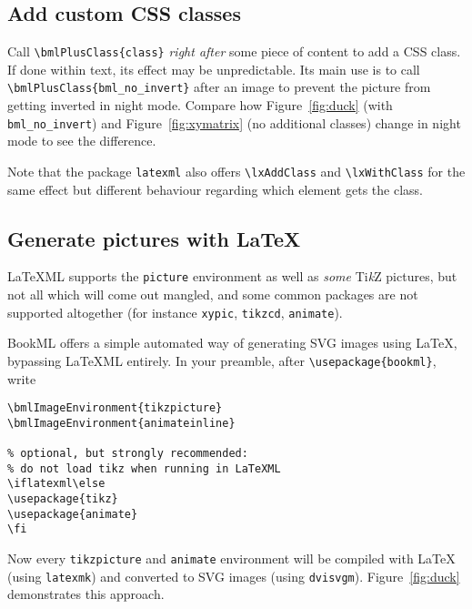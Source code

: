 \documentclass[a4paper,british]{article}
\def\tikzname{Ti\emph{k}Z}
\def\ltxinline{\lstinline[style=bookml]}
\begin{document}
\subsection{Add custom CSS classes}
Call \ltxinline|\bmlPlusClass{class}| \emph{right after} some piece of content to add a CSS class. If done within text, its effect may be unpredictable. Its main use is to call \ltxinline|\bmlPlusClass{bml_no_invert}| after an image to prevent the picture from getting inverted in night mode. Compare how Figure~\ref{fig:duck} (with \ltxinline|bml_no_invert|) and Figure~\ref{fig:xymatrix} (no additional classes) change in night mode to see the difference.

Note that the package \ltxinline|latexml| also offers \ltxinline|\lxAddClass| and \ltxinline|\lxWithClass| for the same effect but different behaviour regarding which element gets the class.

\subsection{Generate pictures with \LaTeX{}}
\label{sec:external-image}

LaTeXML supports the \ltxinline|picture| environment as well as \emph{some} \tikzname{} pictures, but not all which will come out mangled, and some common packages are not supported altogether (for instance \ltxinline|xypic|, \ltxinline|tikzcd|, \ltxinline|animate|).

BookML offers a simple automated way of generating SVG images using \LaTeX{}, bypassing LaTeXML entirely. In your preamble, after \ltxinline|\usepackage{bookml}|, write
\begin{lstlisting}[style=bookml]
\bmlImageEnvironment{tikzpicture}
\bmlImageEnvironment{animateinline}

% optional, but strongly recommended:
% do not load tikz when running in LaTeXML
\iflatexml\else
\usepackage{tikz}
\usepackage{animate}
\fi
\end{lstlisting}

Now every \ltxinline|tikzpicture| and \ltxinline|animate| environment will be compiled with \LaTeX{} (using \lstinline[frame=none]|latexmk|) and converted to SVG images (using \lstinline[frame=none]|dvisvgm|). Figure~\ref{fig:duck} demonstrates this approach.
\end{document}
